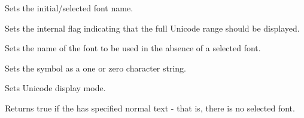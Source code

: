 \label{wxsymbolpickerdialogsetfontname}


Sets the initial/selected font name.

\label{wxsymbolpickerdialogsetfromunicode}


Sets the internal flag indicating that the full Unicode range should be displayed.

\label{wxsymbolpickerdialogsetnormaltextfontname}


Sets the name of the font to be used in the absence of a selected font.

\label{wxsymbolpickerdialogsetsymbol}


Sets the symbol as a one or zero character string.

\label{wxsymbolpickerdialogsetunicodemode}


Sets Unicode display mode.

\label{wxsymbolpickerdialogusenormalfont}


Returns true if the has specified normal text - that is, there is no selected font.

